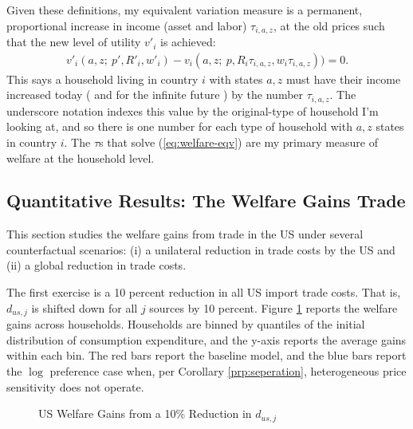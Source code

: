 \documentclass[12pt,pdftex]{article}
\begin{document}
\begin{onehalfspacing}
Given these definitions, my equivalent variation measure is a permanent, proportional increase in income (asset and labor) $\tau_{i,a,z}$, at the old prices such that the new level of utility $v'_i$ is achieved:
\begin{align}
v'_i(a, z ; \ p', R'_{i}, w'_{i}) - v_i(a, z ; \ p, R_{i}\tau_{i,a,z}, w_{i}\tau_{i,a,z})) = 0. \label{eq:welfare-eqv}
\end{align}
This says a household living in country $i$ with states $a,z$ must have their income increased today ( and for the infinite future ) by the number $\tau_{i,a,z}$. The underscore notation indexes this value by the original-type of household I'm looking at, and so there is one number for each type of household with $a,z$ states in country $i$. The $\tau$s that solve (\ref{eq:welfare-eqv}) are my primary measure of welfare at the household level.

\subsection{Quantitative Results: The Welfare Gains Trade}

This section studies the welfare gains from trade in the US under several counterfactual scenarios: (i) a unilateral reduction in trade costs by the US and (ii) a global reduction in trade costs.

The first exercise is a 10 percent reduction in all US import trade costs. That is, $d_{us,j}$ is shifted down for all $j$ sources by 10 percent. Figure \ref{fig:welfare-households} reports the welfare gains across households. Households are binned by quantiles of the initial distribution of consumption expenditure, and the y-axis reports the average gains within each bin. The red bars report the baseline model, and the blue bars report the $\log$ preference case when, per Corollary \ref{prp:seperation}, heterogeneous price sensitivity does not operate.

\begin{figure}[!t]
\caption{US Welfare Gains from a 10\% Reduction in $d_{us,j}$ }\label{fig:welfare-households}
\end{figure}


\end{onehalfspacing}
\end{document}
